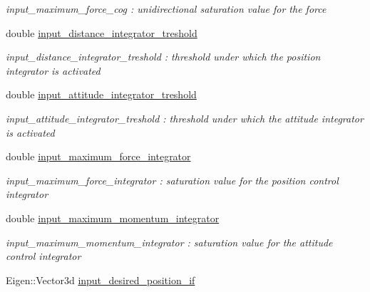 \begin{DoxyCompactItemize}
\begin{DoxyCompactList}\small\item\em input\-\_\-maximum\-\_\-force\-\_\-cog \-: unidirectional saturation value for the force \end{DoxyCompactList}\item 
\hypertarget{struct_skye_parameters_a00f578515588e5d0ab40cc52febe08bf}{double \hyperlink{struct_skye_parameters_a00f578515588e5d0ab40cc52febe08bf}{input\-\_\-distance\-\_\-integrator\-\_\-treshold}}\label{struct_skye_parameters_a00f578515588e5d0ab40cc52febe08bf}

\begin{DoxyCompactList}\small\item\em input\-\_\-distance\-\_\-integrator\-\_\-treshold \-: threshold under which the position integrator is activated \end{DoxyCompactList}\item 
\hypertarget{struct_skye_parameters_af4cc7d48375ee12e4f0e1863e0f11b28}{double \hyperlink{struct_skye_parameters_af4cc7d48375ee12e4f0e1863e0f11b28}{input\-\_\-attitude\-\_\-integrator\-\_\-treshold}}\label{struct_skye_parameters_af4cc7d48375ee12e4f0e1863e0f11b28}

\begin{DoxyCompactList}\small\item\em input\-\_\-attitude\-\_\-integrator\-\_\-treshold \-: threshold under which the attitude integrator is activated \end{DoxyCompactList}\item 
\hypertarget{struct_skye_parameters_a1bfdd5d7181eaa182e6925545e7b35b5}{double \hyperlink{struct_skye_parameters_a1bfdd5d7181eaa182e6925545e7b35b5}{input\-\_\-maximum\-\_\-force\-\_\-integrator}}\label{struct_skye_parameters_a1bfdd5d7181eaa182e6925545e7b35b5}

\begin{DoxyCompactList}\small\item\em input\-\_\-maximum\-\_\-force\-\_\-integrator \-: saturation value for the position control integrator \end{DoxyCompactList}\item 
\hypertarget{struct_skye_parameters_a5c05c4be8f429eab4ec19e41130a0d39}{double \hyperlink{struct_skye_parameters_a5c05c4be8f429eab4ec19e41130a0d39}{input\-\_\-maximum\-\_\-momentum\-\_\-integrator}}\label{struct_skye_parameters_a5c05c4be8f429eab4ec19e41130a0d39}

\begin{DoxyCompactList}\small\item\em input\-\_\-maximum\-\_\-momentum\-\_\-integrator \-: saturation value for the attitude control integrator \end{DoxyCompactList}\item 
\hypertarget{struct_skye_parameters_a2a7f81ce2ec7d633f02c77060da8139c}{Eigen\-::\-Vector3d \hyperlink{struct_skye_parameters_a2a7f81ce2ec7d633f02c77060da8139c}{input\-\_\-desired\-\_\-position\-\_\-if}}\label{struct_skye_parameters_a2a7f81ce2ec7d633f02c77060da8139c}


\end{DoxyCompactItemize}
